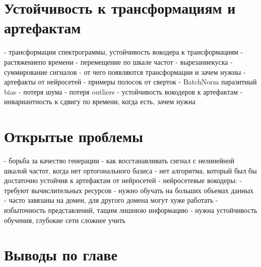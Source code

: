\section{Устойчивость к трансформациям и артефактам}
\begin{markdown}
 - трансформации спектрограммы, устойчивость вокодера к трансформациям
   - растяжение по времени
   - перемещение по шкале частот
   - вырезание куска
   - суммирование сигналов
 - от чего появляются трансформации и зачем нужны
 - артефакты от нейросетей
   - примеры полосок от сверток
   - BatchNorm паразитный bias
   - потеря шума
   - потеря outliers
 - устойчивость вокодеров к артефактам
 - инвариантность к сдвигу по времени, когда есть, зачем нужна
\end{markdown}

\section{Открытые проблемы}
\begin{markdown}
 - борьба за качество генерации
 - как восстанавливать сигнал с нелинейной шкалой частот, когда нет ортогонального базиса
 - нет алгоритма, который был бы достаточно устойчив к артефактам от нейросетей
 - нейросетевые вокодеры:
   - требуют вычислительных ресурсов
   - нужно обучать на больших объемах данных
   - часто завязаны на домен, для другого домена могут хуже работать
 - избыточность представлений, тащим лишнюю информацию
 - нужна устойчивость обучения, глубокие сети сложнее учить
\end{markdown}

\section{Выводы по главе}


